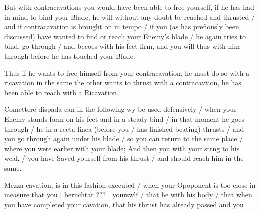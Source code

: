 
But with contracavations you would have been able to free yourself, if
he has had in mind to bind your Blade, he will without any doubt be
reached and thrusted / and if contracavation is brought on in tempo /
if you (as has prefiously been discussed) have wanted to find or reach
your Enemy's blade / he again tries to bind, go through / and becoes
with his feet firm, and you will thus with him through before he has
touched your Blade.


Thus if he wants to free himself from your contracavation, he must do
so with a ricavation in the same the other wants to thrust with a
contracavtion, he has been able to reach with a Ricavation.


Comettere dispada can in the following wy be used defensively / when
your Enemy stands form on his feet and in a steady bind / in that
moment he goes through / he in a recta linea (before you / has
finished beating) thrusts / and you go through again under his blade /
so you can return to the same place / where you were earlier with your
blade; And then you with your strng to his weak / you have Saved
yourself from his thrust / and should reach him in the same.


Mezza cavation, is in this fashion executed / when your Opoponent is
too close in measure that you [ beruchtar ??? ] yourswlf / that he
with his body / that when you have completed your cavation, that his
thrust has already passed and you

